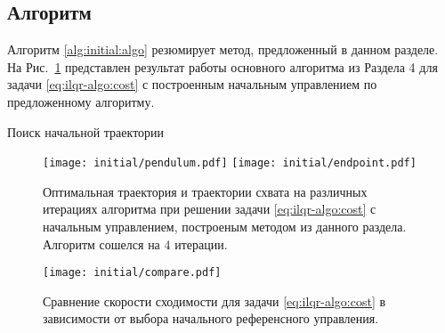 \documentclass[../../doc.tex]{subfiles}
\begin{document}
    \subsection{Алгоритм}

    Алгоритм \ref{alg:initial:algo} резюмирует метод, предложенный в данном разделе.
    На Рис.~\ref{fig:initial:pendulum} представлен результат работы основного алгоритма из Раздела 4 для задачи \eqref{eq:ilqr-algo:cost} с построенным начальным управлением по предложенному алгоритму.

    \clearpage
    \begin{rusalgorithm}\caption{Поиск начальной траектории}\label{alg:initial:algo}
        \DontPrintSemicolon
        
    \end{rusalgorithm}

    \begin{figure}[h]
        \begin{center}
            \texttt{[image: initial/pendulum.pdf]}
            \texttt{[image: initial/endpoint.pdf]}
        \end{center}
        \caption{
            Оптимальная траектория и траектории схвата на различных итерациях алгоритма при решении задачи \eqref{eq:ilqr-algo:cost} с начальным управлением, построеным методом из данного раздела.
            Алгоритм сошелся на $4$ итерации.
        }
        \label{fig:initial:pendulum}
    \end{figure}
    \begin{figure}[h]
        \begin{center}
            \texttt{[image: initial/compare.pdf]}
        \end{center}
        \caption{Сравнение скорости сходимости для задачи \eqref{eq:ilqr-algo:cost} в зависимости от выбора начального референсного управления.}
        \label{fig:compare-init}
    \end{figure}

    \ifSubfilesClassLoaded{
        \nocite{*}
        \clearpage
        
        
    }{}
\end{document}
